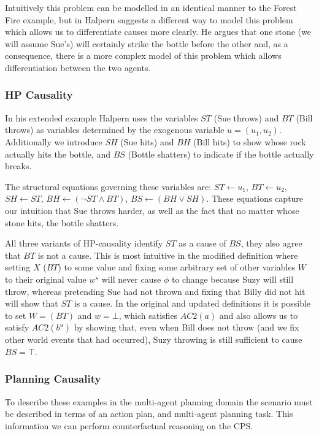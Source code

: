 \documentclass{article}
\theoremstyle{plain}
\theoremstyle{definition}
\begin{document}
Intuitively this problem can be modelled in an identical manner to the Forest Fire example, but in \cite{halpern2005causes} Halpern suggests a different way to model this problem which allows us to differentiate causes more clearly. He argues that one stone (we will assume Sue's) will certainly strike the bottle before the other and, as a consequence, there is a more complex model of this problem which allows differentiation between the two agents.



\subsubsection*{HP Causality}
In his extended example Halpern uses the variables $ST$ (Sue throws) and $BT$ (Bill throws) as variables determined by the exogenous variable $u=(u_1, u_2)$. Additionally we introduce $SH$ (Sue hits) and $BH$ (Bill hits) to show whose rock actually hits the bottle, and $BS$ (Bottle shatters) to indicate if the bottle actually breaks.

The structural equations governing these variables are: $ST\leftarrow u_1$, $BT\leftarrow u_2$, $SH \leftarrow ST$, $BH \leftarrow (\lnot ST \land BT)$, $BS \leftarrow (BH \lor SH)$. These equations capture our intuition that Sue throws harder, as well as the fact that no matter whose stone hits, the bottle shatters.

All three variants of HP-causality identify $ST$ as a cause of $BS$, they also agree that $BT$ is not a cause. This is most intuitive in the modified definition where setting $X$ ($BT$) to some value and fixing some arbitrary set of other variables $W$ to their original value $w^\star$ will never cause $\phi$ to change because Suzy will still throw, whereas pretending Sue had not thrown and fixing that Billy did not hit will show that $ST$ is a cause. In the original and updated definitions it is possible to set $W=(BT)$ and $w=\bot$, which satisfies $AC2(a)$ and also allows us to satisfy $AC2(b^u)$ by showing that, even when Bill does not throw (and we fix other world events that had occurred), Suzy throwing is still sufficient to cause $BS=\top$. 


\subsubsection*{Planning Causality}
To describe these examples in the multi-agent planning domain the scenario must be described in terms of an action plan, and multi-agent planning task. This information we can perform counterfactual reasoning on the CPS.
\end{document}
